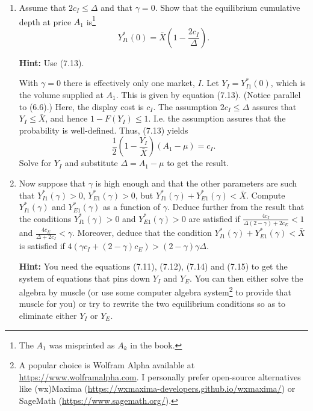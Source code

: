 \documentclass[11pt
, answers
]{exam}
\begin{document}
\begin{enumerate}[label=(\alph*). ]
	\item Assume that $2c_{I} \leq \Delta$ and that $\gamma=0$. Show that the equilibrium cumulative depth at price $A_{1}$ is\footnote{The $A_{1}$ was misprinted as $A_{k}$ in the book.}  
	\[
	Y^{*}_{I1}(0)=\bar{X}\left( 1-\frac{2c_{I}}{\Delta}\right).
	\]
	
	\textbf{Hint:} Use (7.13).
	
	\begin{solution}
		With $\gamma=0$ there is effectively only one market, $I$. Let $Y_{I}=Y^{*}_{I1}(0)$, which is the volume supplied at $A_{1}$. This is given by equation (7.13). (Notice parallel to (6.6).) Here, the display cost is $c_{I}$. The assumption $2c_{I} \leq \Delta$ assures that $Y_{I} \leq \bar{X}$, and hence $1-F(Y_{I}) \leq 1$. I.e. the assumption assures that the probability is well-defined. Thus, (7.13) yields
		\[
		\frac{1}{2}\left(1-\frac{Y_{I}}{\bar{X}}\right) (A_{1}-\mu) = c_{I}.
		\]
		Solve for $Y_{I}$ and substitute $\Delta=A_1-\mu$ to get the result.
	\end{solution}
	
	
	\item Now suppose that $\gamma$ is high enough and that the other parameters are such that $Y^{*}_{I1}(\gamma)>0$, $Y^{*}_{E1}(\gamma)>0$, but $Y^{*}_{I1}(\gamma)+Y^{*}_{E1}(\gamma)<\bar{X}$. Compute $Y^{*}_{I1}(\gamma)$ and $Y^{*}_{E1}(\gamma)$ as a function of $\gamma$. Deduce further from the result that the conditions  $Y^{*}_{I1}(\gamma)>0$ and $Y^{*}_{E1}(\gamma)>0$ are satisfied if $\frac{4c_{I}}{\Delta(2-\gamma)+2c_{E}}<1$ and $\frac{4c_{E}}{\Delta+2c_{I}}<\gamma$. Moreover, deduce that the condition $Y^{*}_{I1}(\gamma)+Y^{*}_{E1}(\gamma)<\bar{X}$ is satisfied if $4(\gamma c_{I}+(2-\gamma)c_{E})>(2-\gamma)\gamma \Delta$.
	
	\textbf{Hint:} You need the equations (7.11), (7.12), (7.14) and (7.15) to get the system of equations that pins down $Y_I$ and $Y_E$. You can then either solve the algebra by muscle (or use some computer algebra system\footnote{A popular choice is Wolfram Alpha available at \url{https://www.wolframalpha.com}. I personally prefer open-source alternatives like (wx)Maxima (\url{https://wxmaxima-developers.github.io/wxmaxima/}) or SageMath (\url{https://www.sagemath.org/}).} to provide that muscle for you) or try to rewrite the two equilibrium conditions so as to eliminate either $Y_I$ or $Y_E$. 
	

\end{enumerate}
\end{document}
